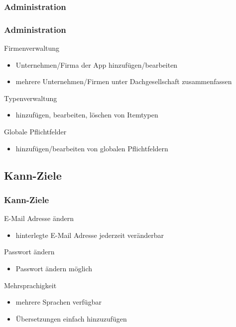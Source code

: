 \documentclass{beamer}
\begin{document}
\subsubsection{Administration}

\begin{frame}
\frametitle{Administration}

\begin{block}{Firmenverwaltung}
\begin{itemize}
\item Unternehmen/Firma der App hinzufügen/bearbeiten
\item mehrere Unternehmen/Firmen unter Dachgesellschaft zusammenfassen
\end{itemize}
\end{block}

\begin{block}{Typenverwaltung}
\begin{itemize}
\item hinzufügen, bearbeiten, löschen von Itemtypen
\end{itemize}
\end{block}

\begin{block}{Globale Pflichtfelder}
\begin{itemize}
\item hinzufügen/bearbeiten von globalen Pflichtfeldern
\end{itemize}
\end{block}

\end{frame}

\subsection{Kann-Ziele}

\begin{frame}
\frametitle{Kann-Ziele}

\begin{block}{E-Mail Adresse ändern}
\begin{itemize}
\item hinterlegte E-Mail Adresse jederzeit veränderbar
\end{itemize}
\end{block}

\begin{block}{Passwort ändern}
\begin{itemize}
\item Passwort ändern möglich
\end{itemize}
\end{block}

\begin{block}{Mehrsprachigkeit}
\begin{itemize}
\item mehrere Sprachen verfügbar
\item Übersetzungen einfach hinzuzufügen
\end{itemize}
\end{block}
\end{frame}
\end{document}
